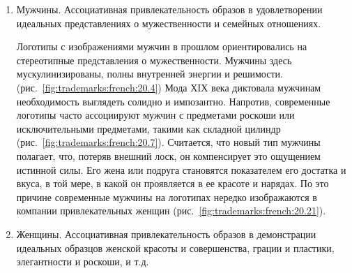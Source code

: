 \begin{enumerate}
\begin{enumerate}
\begin{enumerate}
    \item Мужчины. Ассоциативная привлекательность образов в удовлетворении
      идеальных представлениях о мужественности и семейных отношениях.

      Логотипы с изображениями мужчин в прошлом ориентировались на стереотипные
      представления о мужественности. Мужчины здесь мускулинизированы, полны
      внутренней энергии и решимости. (рис.~\ref{fig:trademarks:french:20.4})
      Мода ХIХ века диктовала мужчинам необходимость выглядеть солидно и
      импозантно. Напротив, современные логотипы часто ассоциируют мужчин с
      предметами роскоши или исключительными предметами, такими как складной
      цилиндр (рис.~\ref{fig:trademarks:french:20.7}). Считается, что новый тип
      мужчины полагает, что, потеряв внешний лоск, он компенсирует это ощущением
      истинной силы. Его жена или подруга становятся показателем его достатка и
      вкуса, в той мере, в какой он проявляется в ее красоте и нарядах. По это
      причине современные мужчины на логотипах нередко изображаются в компании
      привлекательных женщин (рис.~\ref{fig:trademarks:french:20.21}).

    \item Женщины. Ассоциативная привлекательность образов в демонстрации
      идеальных образцов женской красоты и совершенства, грации и пластики,
      элегантности и роскоши, и т.д.


\end{enumerate}
\end{enumerate}
\end{enumerate}

